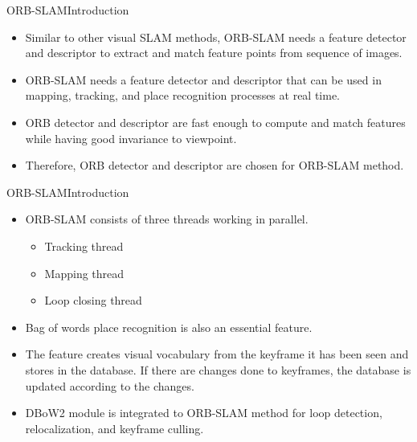 \documentclass[aspectratio=169]{beamer}
\begin{document}
\begin{frame}{ORB-SLAM}{Introduction}
\begin{itemize}
  \item{
  Similar to other visual SLAM methods, ORB-SLAM needs a feature detector and descriptor to extract and match feature points from sequence of images.
  }  
\item{
ORB-SLAM needs a feature detector and descriptor that can be used in mapping, tracking, and place recognition processes at real time. 
}
\item{
ORB detector and descriptor are fast enough to compute and match features while having good invariance to viewpoint.
}
\item{
Therefore, ORB detector and descriptor are chosen for ORB-SLAM method.
}

\end{itemize}
  \end{frame}
  
\begin{frame}{ORB-SLAM}{Introduction}
 
\begin{itemize}
  
      \item{
ORB-SLAM consists of three threads working in parallel.
\begin{itemize}
    \item{
    Tracking thread
    }
    \item{
    Mapping thread
    }
    \item{
    Loop closing thread 
    }
\end{itemize}
}
\item{
    Bag of words place recognition is also an essential feature.
}
\item{
    The feature creates visual vocabulary from the keyframe it has been seen and stores in the database. If there are changes done to keyframes, the database is updated according to the changes.
}
\item{
    DBoW2 module is integrated to ORB-SLAM method for loop detection, relocalization, and keyframe culling.
}
  \end{itemize}
\end{frame}
\end{document}
